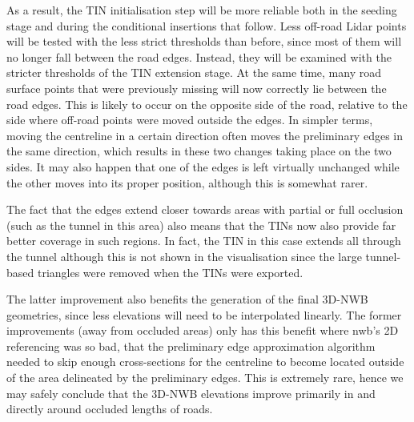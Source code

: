 As a result, the TIN initialisation step will be more reliable both in the seeding stage and during the conditional insertions that follow. Less off-road Lidar points will be tested with the less strict thresholds than before, since most of them will no longer fall between the road edges. Instead, they will be examined with the stricter thresholds of the TIN extension stage. At the same time, many road surface points that were previously missing will now correctly lie between the road edges. This is likely to occur on the opposite side of the road, relative to the side where off-road points were moved outside the edges. In simpler terms, moving the centreline in a certain direction often moves the preliminary edges in the same direction, which results in these two changes taking place on the two sides. It may also happen that one of the edges is left virtually unchanged while the other moves into its proper position, although this is somewhat rarer.

The fact that the edges extend closer towards areas with partial or full occlusion (such as the tunnel in this area) also means that the TINs now also provide far better coverage in such regions. In fact, the TIN in this case extends all through the tunnel although this is not shown in the visualisation since the large tunnel-based triangles were removed when the TINs were exported.

The latter improvement also benefits the generation of the final 3D-NWB geometries, since less elevations will need to be interpolated linearly. The former improvements (away from occluded areas) only has this benefit where \ac{nwb}'s 2D referencing was so bad, that the preliminary edge approximation algorithm needed to skip enough cross-sections for the centreline to become located outside of the area delineated by the preliminary edges. This is extremely rare, hence we may safely conclude that the 3D-NWB elevations improve primarily in and directly around occluded lengths of roads.

